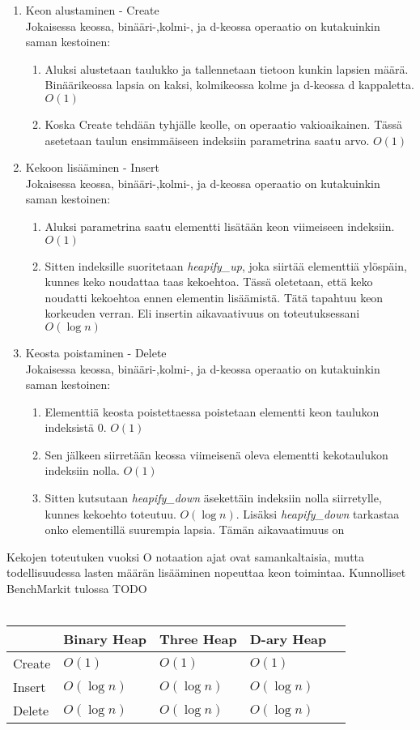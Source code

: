 \documentclass[a4paper,12pt]{article}
\begin{document}
\begin{enumerate}
\item Keon alustaminen - Create\\
Jokaisessa keossa, binääri-,kolmi-, ja d-keossa operaatio on kutakuinkin saman kestoinen:
\begin{enumerate}
\item Aluksi alustetaan taulukko ja tallennetaan tietoon kunkin lapsien määrä.
Binäärikeossa lapsia on kaksi, kolmikeossa kolme ja d-keossa d kappaletta. $O(1)$
\item Koska Create tehdään tyhjälle keolle, on operaatio vakioaikainen. Tässä asetetaan taulun ensimmäiseen indeksiin parametrina saatu arvo. $O(1)$
\end{enumerate}
\item Kekoon lisääminen - Insert\\
Jokaisessa keossa, binääri-,kolmi-, ja d-keossa operaatio on kutakuinkin saman kestoinen:
\begin{enumerate}
\item Aluksi parametrina saatu elementti lisätään keon viimeiseen indeksiin.$O(1)$
\item Sitten indeksille suoritetaan \emph{heapify\_up}, joka siirtää elementtiä ylöspäin, kunnes keko noudattaa taas kekoehtoa. Tässä oletetaan, että keko noudatti kekoehtoa ennen elementin lisäämistä.
Tätä tapahtuu keon korkeuden verran. Eli insertin aikavaativuus on toteutuksessani $O(\log n)$
\end{enumerate}
\item Keosta poistaminen - Delete\\
Jokaisessa keossa, binääri-,kolmi-, ja d-keossa operaatio on kutakuinkin saman kestoinen:
\begin{enumerate}
\item Elementtiä keosta poistettaessa poistetaan elementti keon taulukon indeksistä 0. $O(1)$
\item Sen jälkeen siirretään keossa viimeisenä oleva elementti kekotaulukon indeksiin nolla. $O(1)$
\item Sitten kutsutaan \emph{heapify\_down} äsekettäin indeksiin nolla siirretylle, kunnes kekoehto toteutuu. $O(\log n)$. Lisäksi \emph{heapify\_down} tarkastaa onko elementillä suurempia lapsia. Tämän aikavaatimuus on 
\end{enumerate}
\end{enumerate}
Kekojen toteutuken vuoksi O notaation ajat ovat samankaltaisia, mutta todellisuudessa lasten määrän lisääminen nopeuttaa keon toimintaa. Kunnolliset BenchMarkit tulossa TODO\\\\
\begin{tabular}{|l|l|l|l|l|}
\hline
&Binary Heap & Three Heap & D-ary Heap \\\hline
Create & $O (1)$ & $O (1)$ & $O (1)$\\\hline
Insert & $O (\log n)$ & $O (\log n)$ & $O (\log n)$\\\hline
Delete  & $O (\log n)$ & $O (\log n)$ & $O (\log n)$\\\hline

\end{tabular}
\end{document}
